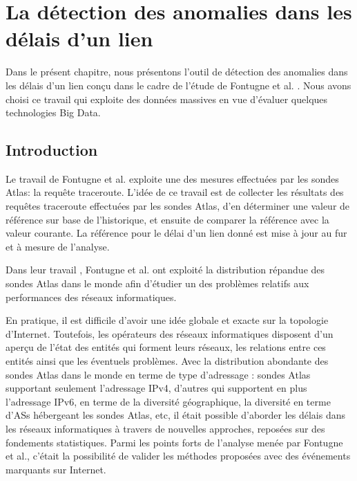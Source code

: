 \chapter{La détection des anomalies dans les délais d'un lien} \label{chap:algorith-detection}

Dans le présent chapitre, nous présentons l'outil de détection des anomalies dans les délais d'un lien  conçu dans le cadre de l'étude  de  Fontugne et al. \cite{DBLP:journals/corr/FontugneAPB16}. Nous avons choisi ce travail qui exploite des données massives en vue d'évaluer quelques technologies  Big Data.

\section{Introduction}
Le travail de  Fontugne  et al.\cite{DBLP:journals/corr/FontugneAPB16} exploite une des mesures effectuées par les sondes Atlas: la requête traceroute. L'idée de ce travail est de collecter les résultats des requêtes traceroute effectuées par les sondes Atlas, d'en déterminer une valeur de référence sur base de l'historique, et ensuite de comparer la référence avec la valeur courante. La référence pour le délai  d'un lien donné   est mise à jour au fur et à mesure de l'analyse.



Dans leur travail \cite{DBLP:journals/corr/FontugneAPB16}, Fontugne et al. ont exploité la  distribution répandue des sondes Atlas dans le monde afin d'étudier un des problèmes relatifs aux performances des réseaux informatiques. 

En pratique, il est  difficile  d'avoir une idée globale et exacte sur la topologie d'Internet. Toutefois, les opérateurs des réseaux informatiques  disposent d'un aperçu de l'état des entités qui forment leurs réseaux, les relations entre ces entités ainsi que les éventuels problèmes. Avec la distribution abondante des sondes Atlas dans le monde en terme de type d'adressage : sondes Atlas supportant seulement l'adressage IPv4, d'autres qui supportent en plus l'adressage IPv6, en terme de  la diversité géographique, la diversité en terme d'ASs hébergeant les sondes Atlas, etc, il était  possible d'aborder  les délais dans les réseaux informatiques à travers de nouvelles approches, reposées sur des fondements statistiques. Parmi les points forts de l'analyse menée par  Fontugne et al., c'était la possibilité de valider les   méthodes proposées avec des événements  marquants sur Internet.

